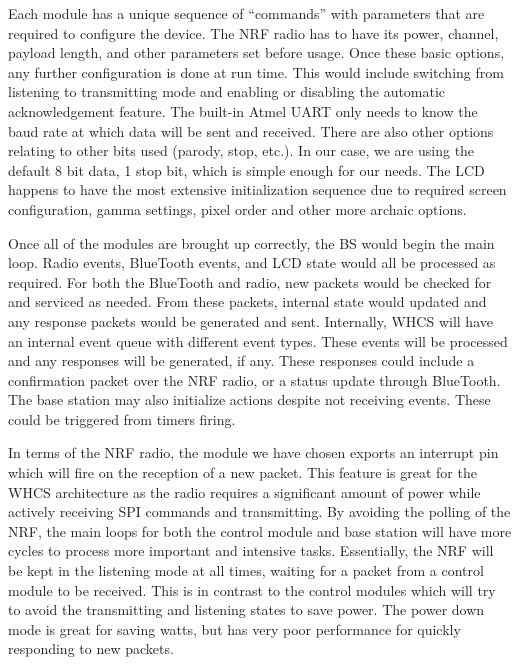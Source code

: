Each module has a unique sequence of ``commands'' with parameters that are
required to configure the device. The NRF radio has to have its power, channel,
payload length, and other parameters set before usage. Once these basic
options, any further configuration is done at run time. This would include
switching from listening to transmitting mode and enabling or disabling the
automatic acknowledgement feature. The built-in Atmel UART only needs to know
the baud rate at which data will be sent and received. There are also other
options relating to other bits used (parody, stop, etc.). In our case, we are
using the default 8 bit data, 1 stop bit, which is simple enough for our needs.
The LCD happens to have the most extensive initialization sequence due to
required screen configuration, gamma settings, pixel order and other more
archaic options.

Once all of the modules are brought up correctly, the BS would begin the main loop.
Radio events, BlueTooth events, and LCD state would all be processed as
required. For both the BlueTooth and radio, new packets would be checked for
and serviced as needed. From these packets, internal state would updated and any
response packets would be generated and sent. Internally, WHCS will have an
internal event queue with different event types. These events will be processed
and any responses will be generated, if any. These responses could include a
confirmation packet over the NRF radio, or a status update through BlueTooth.
The base station may also initialize actions despite not receiving events.
These could be triggered from timers firing.

In terms of the NRF radio, the module we have chosen exports an interrupt pin
which will fire on the reception of a new packet. This feature is great for the
WHCS architecture as the radio requires a significant amount of power
while actively receiving SPI commands and transmitting. By avoiding the polling
of the NRF, the main loops for both the control module and base station will
have more cycles to process more important and intensive tasks. Essentially,
the NRF will be kept in the listening mode at all times, waiting for a packet
from a control module to be received. This is in contrast to the control
modules which will try to avoid the transmitting and listening states to save
power. The power down mode is great for saving watts, but has very poor
performance for quickly responding to new packets.

